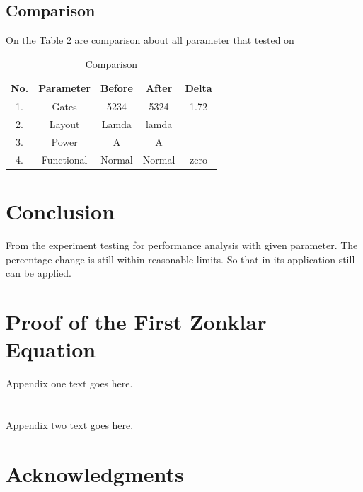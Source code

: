 \documentclass[10pt,journal,compsoc]{IEEEtran}
\begin{document}
\subsection{Comparison}
On the Table 2 are comparison about all parameter that tested on
{\renewcommand{\arraystretch}{1.2}
\begin{table}[h]
	\centering
	\caption{Comparison}
	\label{comparison}
	\begin{tabular}{|c|c|c|c|c|}
		\hline
		\rowcolor[HTML]{C0C0C0} 
		No.                        & Parameter  & Before & After  & Delta \\ \hline
		\cellcolor[HTML]{EFEFEF}1. & Gates      & 5234   & 5324   & 1.72  \\ \hline
		\cellcolor[HTML]{EFEFEF}2. & Layout     & Lamda  & lamda  &       \\ \hline
		\cellcolor[HTML]{EFEFEF}3. & Power      & A      & A      &       \\ \hline
		\cellcolor[HTML]{EFEFEF}4. & Functional & Normal & Normal & zero  \\ \hline
	\end{tabular}
\end{table}
}
\section{Conclusion}
From the experiment testing for performance analysis with given parameter. The percentage change is still within reasonable limits. So that in its application still can be applied.

\appendices
\section{Proof of the First Zonklar Equation}
Appendix one text goes here.

\section{}
Appendix two text goes here.

\ifCLASSOPTIONcompsoc
  \section*{Acknowledgments}
\else
\end{document}
